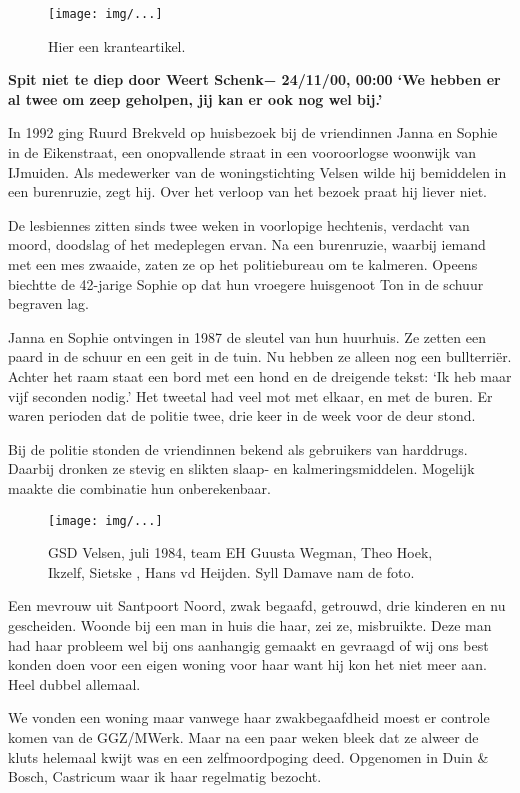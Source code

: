 \documentclass[10pt,twoside,openright]{memoir}
\begin{document}
\begin{figure}[t]
\texttt{[image: img/...]}
\caption{Hier een kranteartikel.}
\end{figure}

\textbf{Spit niet te diep
door Weert Schenk− 24/11/00, 00:00
`We hebben er al twee om zeep geholpen, jij kan er ook nog wel bij.'}

In 1992 ging Ruurd Brekveld op huisbezoek bij de vriendinnen Janna en Sophie in de Eikenstraat, een onopvallende straat in een vooroorlogse woonwijk van IJmuiden. Als medewerker van de woningstichting Velsen wilde hij bemiddelen in een burenruzie, zegt hij. Over het verloop van het bezoek praat hij liever niet.

De lesbiennes zitten sinds twee weken in voorlopige hechtenis, verdacht van moord, doodslag of het medeplegen ervan. Na een burenruzie, waarbij iemand met een mes zwaaide, zaten ze op het politiebureau om te kalmeren. Opeens biechtte de 42-jarige Sophie op dat hun vroegere huisgenoot Ton in de schuur begraven lag.

Janna en Sophie ontvingen in 1987 de sleutel van hun huurhuis. Ze zetten een paard in de schuur en een geit in de tuin. Nu hebben ze alleen nog een bullterriër. Achter het raam staat een bord met een hond en de dreigende tekst: `Ik heb maar vijf seconden nodig.' Het tweetal had veel mot met elkaar, en met de buren. Er waren perioden dat de politie twee, drie keer in de week voor de deur stond.

Bij de politie stonden de vriendinnen bekend als gebruikers van harddrugs. Daarbij dronken ze stevig en slikten slaap- en kalmeringsmiddelen. Mogelijk maakte die combinatie hun onberekenbaar.

\begin{figure}[t]
\texttt{[image: img/...]}
\caption{GSD Velsen, juli 1984, team EH Guusta Wegman, Theo Hoek, Ikzelf, Sietske , Hans vd Heijden. Syll Damave nam de foto.}
\end{figure}

Een mevrouw uit Santpoort Noord, zwak begaafd, getrouwd, drie kinderen en nu gescheiden. Woonde bij een man in huis die haar, zei ze, misbruikte. Deze man had haar probleem wel bij ons aanhangig gemaakt en gevraagd of wij ons best konden doen voor een eigen woning voor haar want hij kon het niet meer aan. Heel dubbel allemaal. 

We vonden een woning maar vanwege haar zwakbegaafdheid moest er controle komen van de GGZ/MWerk. Maar na een paar weken bleek dat ze alweer de kluts helemaal kwijt was en een zelfmoordpoging deed. Opgenomen in Duin \& Bosch, Castricum waar ik haar regelmatig bezocht. 
\end{document}
